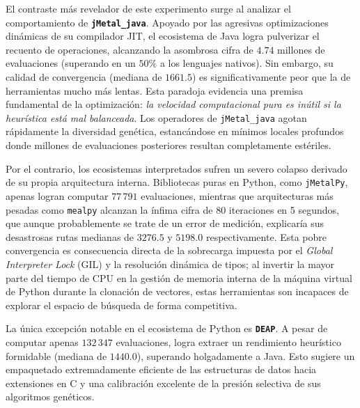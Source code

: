 \documentclass[12pt,a4paper,twoside,openright]{book}
\begin{document}
    El contraste más revelador de este experimento surge al analizar el comportamiento de \textbf{\texttt{jMetal\_java}}. Apoyado por las agresivas optimizaciones dinámicas de su compilador JIT, el ecosistema de Java logra pulverizar el recuento de operaciones, alcanzando la asombrosa cifra de $4.74$ millones de evaluaciones (superando en un $50\%$ a los lenguajes nativos). Sin embargo, su calidad de convergencia (mediana de $1661.5$) es significativamente peor que la de herramientas mucho más lentas. Esta paradoja evidencia una premisa fundamental de la optimización: \textit{la velocidad computacional pura es inútil si la heurística está mal balanceada}. Los operadores de \texttt{jMetal\_java} agotan rápidamente la diversidad genética, estancándose en mínimos locales profundos donde millones de evaluaciones posteriores resultan completamente estériles.

    Por el contrario, los ecosistemas interpretados sufren un severo colapso derivado de su propia arquitectura interna. Bibliotecas puras en Python, como \texttt{jMetalPy}, apenas logran computar $77\,791$ evaluaciones, mientras que arquitecturas más pesadas como \texttt{mealpy} alcanzan la ínfima cifra de $80$ iteraciones en 5 segundos, que aunque probablemente se trate de un error de medición, explicaría sus desastrosas rutas medianas de $3276.5$ y $5198.0$ respectivamente. Esta pobre convergencia es consecuencia directa de la sobrecarga impuesta por el \textit{Global Interpreter Lock} (GIL) y la resolución dinámica de tipos; al invertir la mayor parte del tiempo de CPU en la gestión de memoria interna de la máquina virtual de Python durante la clonación de vectores, estas herramientas son incapaces de explorar el espacio de búsqueda de forma competitiva.

    La única excepción notable en el ecosistema de Python es \textbf{\texttt{DEAP}}. A pesar de computar apenas $132\,347$ evaluaciones, logra extraer un rendimiento heurístico formidable (mediana de $1440.0$), superando holgadamente a Java. Esto sugiere un empaquetado extremadamente eficiente de las estructuras de datos hacia extensiones en C y una calibración excelente de la presión selectiva de sus algoritmos genéticos. 
\end{document}
